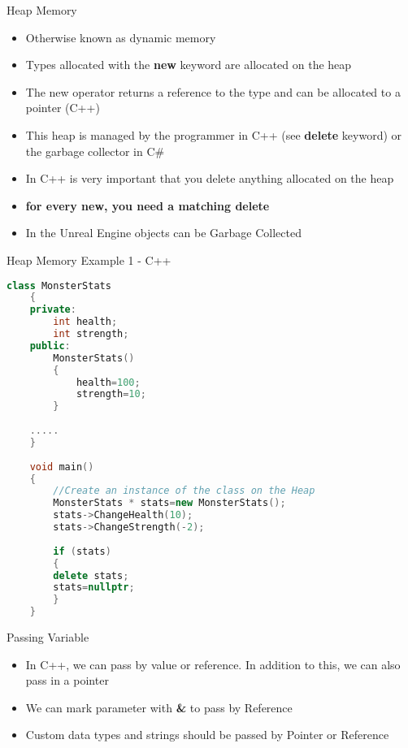 \begin{frame}{Heap Memory}
	\begin{itemize}
	\pause \item Otherwise known as dynamic memory
	\pause \item Types allocated with the \textbf{new} keyword are allocated on the heap
	\pause \item The new operator returns a reference to the type and can be allocated to a pointer (C++)
	\pause \item This heap is managed by the programmer in C++ (see \textbf{delete} keyword) or the garbage collector in C\#
	\pause \item In C++ is very important that you delete anything allocated on the heap
	\pause \item \textbf{for every new, you need a matching delete}
	\pause \item In the Unreal Engine objects can be Garbage Collected
	\end{itemize}
\end{frame}


\begin{frame}[fragile]{Heap Memory Example 1 - C++}
\begin{lstlisting}[language=C++,basicstyle=\tiny,]
	class MonsterStats
	{
	private:
		int health;
		int strength;
	public:
		MonsterStats()
		{
			health=100;
			strength=10;
		}
		
	.....
	}
	
	void main()
	{		
		//Create an instance of the class on the Heap
		MonsterStats * stats=new MonsterStats();
		stats->ChangeHealth(10);
		stats->ChangeStrength(-2);
	
		if (stats)
		{
		delete stats;
		stats=nullptr;
		}
	}
\end{lstlisting}
\end{frame}

\begin{frame}{Passing Variable}
	\begin{itemize}
		\pause \item In C++, we can pass by value or reference. In addition to this, we can also pass in a pointer
		\pause \item We can mark parameter with \textbf{\&} to pass by Reference 
		\pause \item Custom data types and strings should be passed by Pointer or Reference
	\end{itemize}
\end{frame}

